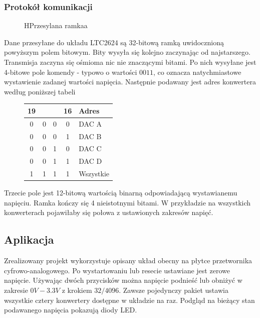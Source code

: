 \documentclass[a4paper,12pt]{article}
\begin{document}
\newpage
\subsubsection{Protokół komunikacji}

\begin{figure}[htb]
  \centering
	\begin{register}{H}{Przesylana ramka}{a}
	\label{dacprotocol}%
	\end{register}
\end{figure}

Dane przesyłane do układu LTC2624 są 32-bitową ramką uwidocznioną powyższym polem bitowym. Bity wysyła się kolejno zaczynając od najstarszego. Transmisja zaczyna się ośmioma nic nie znaczącymi bitami. Po nich wysyłane jest 4-bitowe pole komendy - typowo o wartości $0011$, co oznacza natychmiastowe wystawienie zadanej wartości napięcia. Następnie podawany jest adres konwertera według poniższej tabeli

\begin{figure}[htb]
  \centering
	\begin{tabular}{|c|c|c|c|l|}
	  \multicolumn{1}{r}{19}&\multicolumn{1}{r}{}&\multicolumn{1}{r}{}&\multicolumn{1}{r}{16}&\multicolumn{1}{l}{Adres}\\
		\hline
		0&0&0&0 & DAC A\\
		\hline
		0&0&0&1 & DAC B\\
		\hline
		0&0&1&0 & DAC C\\
		\hline
		0&0&1&1 & DAC D\\
		\hline
		1&1&1&1 & Wszystkie\\
		\hline
	\end{tabular}
\end{figure}

Trzecie pole jest 12-bitową wartością binarną odpowiadającą wystawianemu napięciu. Ramka kończy się 4 nieistotnymi bitami. W przykładzie na wszystkich konwerterach pojawiłaby się połowa z ustawionych zakresów napięć.


\subsection{Aplikacja}

Zrealizowany projekt wykorzystuje opisany układ obecny na płytce przetwornika cyfrowo-analogowego. Po wystartowaniu lub resecie ustawiane jest zerowe napięcie. Używając dwóch przycisków można napięcie podnieść lub obniżyć w zakresie $0V - 3.3V$ z krokiem $32 / 4096$. Zawsze pojedynczy pakiet ustawia wszystkie cztery konwertery dostępne w układzie na raz. Podgląd na bieżący stan podawanego napięcia pokazują diody LED.
\end{document}
